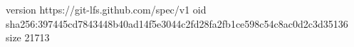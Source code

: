 version https://git-lfs.github.com/spec/v1
oid sha256:397445cd7843448b40ad14f5e3044c2fd28fa2fb1ce598c54c8ac0d2c3d35136
size 21713
